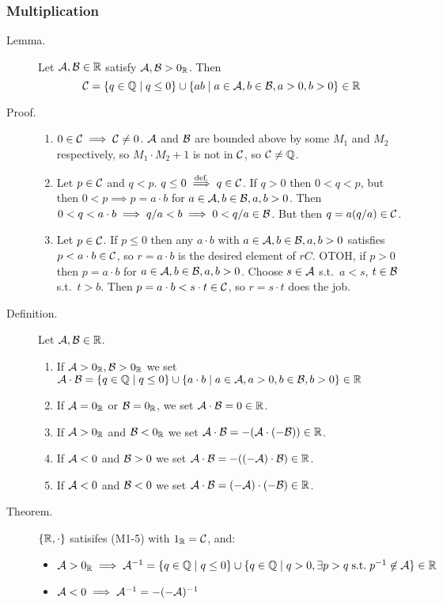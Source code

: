 \documentclass[letterpaper,11pt]{article}
\begin{document}
\subsubsection{Multiplication}
\begin{description}
\item[Lemma.] Let $\mathcal{A},\mathcal{B}\in\mathbb{R}$ satisfy $\mathcal{A},\mathcal{B}>0_{\mathbb{R}}$. Then
    \[
    \mathcal{C}=\{q\in\mathbb{Q}\;|\;q\le 0\}\cup\{ab\;|\;a\in\mathcal{A},b\in\mathcal{B},a>0,b>0\}\in\mathbb{R}
    \]
\item[Proof.]\mbox{}
  \begin{enumerate}[(C1)]
  \item $0\in\mathcal{C}\implies\mathcal{C}\ne0$. $\mathcal{A}$ and $\mathcal{B}$ are bounded above by some
      $M_1$ and $M_2$ respectively, so $M_1\cdot M_2+1$ is not in $\mathcal{C}$, so $\mathcal{C}\ne\mathbb{Q}$.
  \item Let $p\in\mathcal{C}$ and $q<p$. $q\le0 \stackrel{\text{def.}}{\implies} q\in\mathcal{C}$. If $q>0$ then
      $0<q<p$, but then $0<p\implies p=a\cdot b$ for $a\in\mathcal{A}, b\in\mathcal{B}, a,b>0$.
      Then $0<q<a\cdot b\implies q/a<b\implies 0<q/a\in\mathcal{B}$. But then
      $q=a(q/a)\in\mathcal{C}$.
  \item Let $p\in\mathcal{C}$. If $p\le0$ then any $a\cdot b$ with $a\in\mathcal{A},b\in\mathcal{B},a,b>0$
      satisfies $p<a\cdot b\in\mathcal{C}$, so $r=a\cdot b$ is the desired element of $rC$.
      OTOH, if $p>0$ then $p=a\cdot b$ for $a\in\mathcal{A},b\in\mathcal{B},a,b>0$. Choose $s\in\mathcal{A}$
      s.t.\ $a<s$, $t\in\mathcal{B}$ s.t.\ $t>b$. Then $p=a\cdot b<s\cdot t\in\mathcal{C}$,
      so $r=s\cdot t$ does the job.
  \end{enumerate}


\item[Definition.] Let $\mathcal{A},\mathcal{B}\in\mathbb{R}$.
  \begin{enumerate}[1)]
  \item If $\mathcal{A}>0_{\mathbb{R}},\mathcal{B}>0_{\mathbb{R}}$ we set
      $\mathcal{A}\cdot\mathcal{B}=\{q\in\mathbb{Q}\;|\;q\le 0\}\cup
       \{a\cdot b\;|\;a\in\mathcal{A},a>0,b\in\mathcal{B},b>0\}\in\mathbb{R}$
  \item If $\mathcal{A}=0_{\mathbb{R}}$ or $\mathcal{B}=0_{\mathbb{R}}$, we set $\mathcal{A}\cdot\mathcal{B}=0\in\mathbb{R}$.
  \item If $\mathcal{A}>0_{\mathbb{R}}$ and $\mathcal{B}<0_{\mathbb{R}}$ we set
      $\mathcal{A}\cdot\mathcal{B} = -(\mathcal{A}\cdot(-\mathcal{B}))\in\mathbb{R}$.
  \item If $\mathcal{A}<0$ and $\mathcal{B}>0$ we set $\mathcal{A}\cdot\mathcal{B} = -((-\mathcal{A})\cdot\mathcal{B})\in\mathbb{R}$.
  \item If $\mathcal{A}<0$ and $\mathcal{B}<0$ we set $\mathcal{A}\cdot\mathcal{B} = (-\mathcal{A})\cdot(-\mathcal{B})\in\mathbb{R}$.
  \end{enumerate}


\item[Theorem.] $\{\mathbb{R},\cdot\}$ satisifes (M1-5) with $1_{\mathbb{R}}=\mathcal{C}$, and:
  \begin{itemize}
  \item $\mathcal{A}>0_{\mathbb{R}}\implies{\mathcal{A}^{-1}}=\{q\in\mathbb{Q}\;|\;q\le0\}\cup
      \{q\in\mathbb{Q}\;|\;q>0,\exists p>q\;\text{s.t.}\;{p^{-1}}\not\in\mathcal{A}\}\in\mathbb{R}$
  \item $\mathcal{A}<0\implies{\mathcal{A}^{-1}}=-{(-\mathcal{A})^{-1}}$
  \end{itemize}



\end{description}
\end{document}

